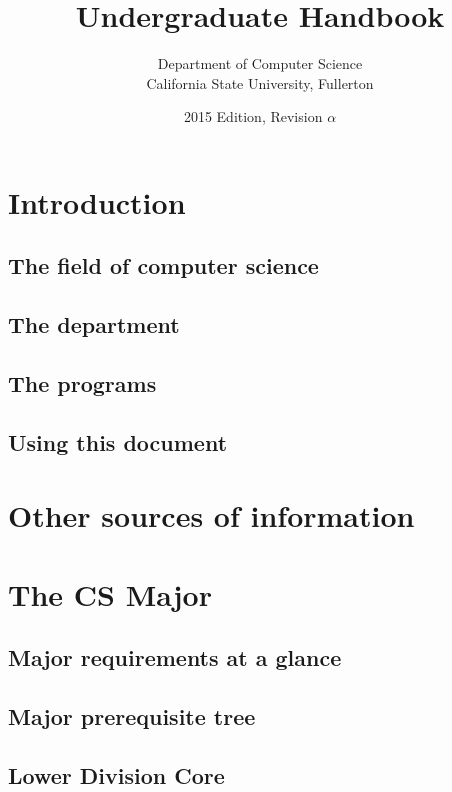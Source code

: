 \documentclass{book}
\begin{document}
\title{Undergraduate Handbook}
\author{Department of Computer Science \\ California State University, Fullerton}
\date{2015 Edition, Revision $\alpha$}
\maketitle

\newpage
\tableofcontents

\chapter{Introduction}

\section{The field of computer science}

\section{The department}

\section{The programs}

\section{Using this document}

\chapter{Other sources of information}

\chapter{The CS Major}

\section{Major requirements at a glance}

\section{Major prerequisite tree}

\section{Lower Division Core}
\end{document}

